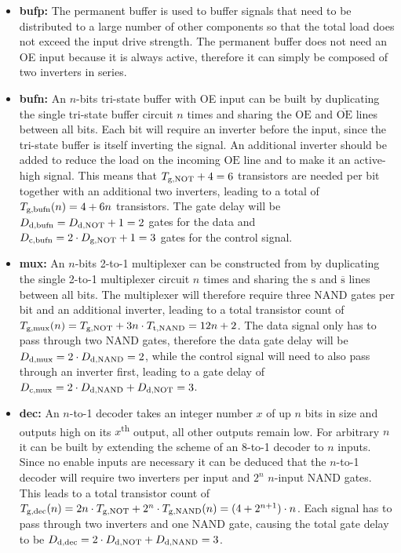 \documentclass[a4paper, 9pt, conference, onecolumn]{ieeeconf}
\newcommand{\bfit}[1]{\item{\bf #1:}}
\newcommand{\ifnn}[1]{\if\relax\detokenize{#1}\relax\else}
\newcommand{\f}[3]{#1_{\text{\ifnn{#2}#2,\fi#3}}}
\newcommand{\signal}[1]{\texttt{$\text{#1}$}}
\newcommand{\signali}[1]{\texttt{$\overline{\text{#1}}$}}
\begin{document}
\begin{itemize}
  \bfit{bufp}
    The permanent buffer is used to buffer signals that need to be distributed to a large number of other components so that the total load does not exceed the input drive strength. The permanent buffer does not need an \ac{OE} input because it is always active, therefore it can simply be composed of two inverters in series.
  \bfit{bufn}
    An $n$-bits tri-state buffer with \ac{OE} input can be built by duplicating the single tri-state buffer circuit\cite[Figure 4]{asakura2003tri} $n$ times and sharing the \signal{OE} and \signali{OE} lines between all bits. Each bit will require an inverter before the input, since the tri-state buffer is itself inverting the signal. An additional inverter should be added to reduce the load on the incoming \signal{OE} line and to make it an active-high signal. This means that $\f{T}{g}{NOT} + 4 = 6$ transistors are needed per bit together with an additional two inverters, leading to a total of $\f{T}{g}{bufn}(n) = 4 + 6n$ transistors. The gate delay will be $\f{D}{d}{bufn} = \f{D}{d}{NOT} + 1 = 2$ gates for the data and $\f{D}{c}{bufn} = 2 \cdot \f{D}{g}{NOT} + 1 = 3$ gates for the control signal.
  \bfit{mux}
    An $n$-bits 2-to-1 multiplexer can be constructed from by duplicating the single 2-to-1 multiplexer circuit\cite[Figure 4]{7375632} $n$ times and sharing the \signal{s} and \signali{s} lines between all bits. The multiplexer will therefore require three NAND gates per bit and an additional inverter, leading to a total transistor count of $\f{T}{g}{mux}(n) = \f{T}{g}{NOT} + 3n \cdot \f{T}{t}{NAND} = 12n + 2$. The data signal only has to pass through two NAND gates, therefore the data gate delay will be $\f{D}{d}{mux} = 2 \cdot \f{D}{d}{NAND} = 2$, while the control signal will need to also pass through an inverter first, leading to a gate delay of $\f{D}{c}{mux} = 2 \cdot \f{D}{d}{NAND} + \f{D}{d}{NOT} = 3$.
  \bfit{dec}
    An $n$-to-1 decoder takes an integer number $x$ of up $n$ bits in size and outputs high on its $x$\textsuperscript{th} output, all other outputs remain low. For arbitrary $n$ it can be built by extending the scheme of an 8-to-1 decoder\cite{74x138} to $n$ inputs. Since no enable inputs are necessary it can be deduced that the $n$-to-1 decoder will require two inverters per input and $2^{n}$ $n$-input NAND gates. This leads to a total transistor count of $\f{T}{g}{dec}(n) = 2n \cdot \f{T}{g}{NOT} + 2^{n} \cdot \f{T}{g}{NAND}(n) = (4 + 2^{n+1}) \cdot n$. Each signal has to pass through two inverters and one NAND gate, causing the total gate delay to be $\f{D}{d}{dec} = 2 \cdot \f{D}{d}{NOT} + \f{D}{d}{NAND} = 3$.

\end{itemize}
\end{document}
